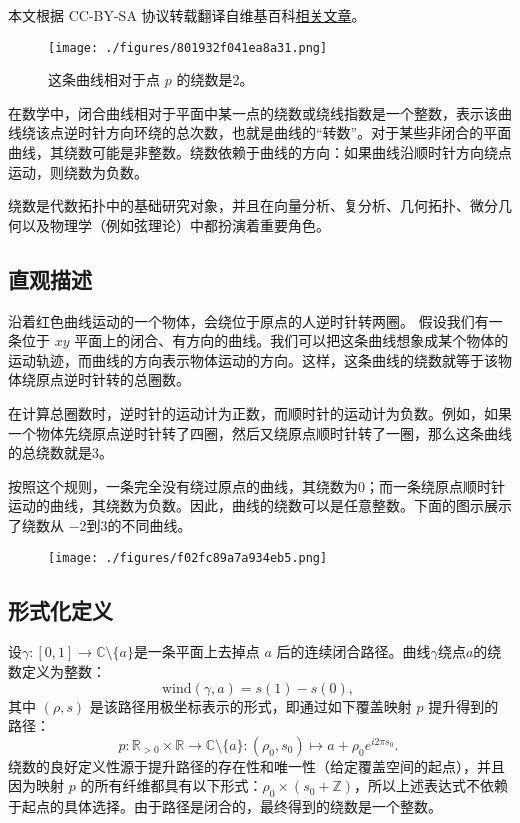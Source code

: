 
本文根据 CC-BY-SA 协议转载翻译自维基百科\href{https://en.wikipedia.org/wiki/Winding_number}{相关文章}。

\begin{figure}[ht]
\centering
\texttt{[image: ./figures/801932f041ea8a31.png]}
\caption{这条曲线相对于点 $p$ 的绕数是2。} \label{fig_JRS_1}
\end{figure}
在数学中，闭合曲线相对于平面中某一点的绕数或绕线指数是一个整数，表示该曲线绕该点逆时针方向环绕的总次数，也就是曲线的“转数”。对于某些非闭合的平面曲线，其绕数可能是非整数。绕数依赖于曲线的方向：如果曲线沿顺时针方向绕点运动，则绕数为负数。

绕数是代数拓扑中的基础研究对象，并且在向量分析、复分析、几何拓扑、微分几何以及物理学（例如弦理论）中都扮演着重要角色。
\subsection{直观描述}
沿着红色曲线运动的一个物体，会绕位于原点的人逆时针转两圈。
假设我们有一条位于 $xy$ 平面上的闭合、有方向的曲线。我们可以把这条曲线想象成某个物体的运动轨迹，而曲线的方向表示物体运动的方向。这样，这条曲线的绕数就等于该物体绕原点逆时针转的总圈数。

在计算总圈数时，逆时针的运动计为正数，而顺时针的运动计为负数。例如，如果一个物体先绕原点逆时针转了四圈，然后又绕原点顺时针转了一圈，那么这条曲线的总绕数就是3。

按照这个规则，一条完全没有绕过原点的曲线，其绕数为0；而一条绕原点顺时针运动的曲线，其绕数为负数。因此，曲线的绕数可以是任意整数。下面的图示展示了绕数从 −2到3的不同曲线。
\begin{figure}[ht]
\centering
\texttt{[image: ./figures/f02fc89a7a934eb5.png]}
\caption{} \label{fig_JRS_2}
\end{figure}
\subsection{形式化定义}
设$\gamma: [0,1] \to \mathbb{C} \setminus \{a\}$是一条平面上去掉点 $a$ 后的连续闭合路径。曲线$\gamma$绕点$a$的绕数定义为整数：
$$
\mathrm{wind}(\gamma, a) = s(1) - s(0),~
$$
其中 $(\rho, s)$ 是该路径用极坐标表示的形式，即通过如下覆盖映射 $p$ 提升得到的路径：
$$
p: \mathbb{R}_{>0} \times \mathbb{R} \to \mathbb{C} \setminus \{a\} : (\rho_0, s_0) \mapsto a + \rho_0 e^{i 2\pi s_0}.~
$$
绕数的良好定义性源于提升路径的存在性和唯一性（给定覆盖空间的起点），并且因为映射 $p$ 的所有纤维都具有以下形式：$\rho_0 \times (s_0 + \mathbb{Z})$，所以上述表达式不依赖于起点的具体选择。由于路径是闭合的，最终得到的绕数是一个整数。
